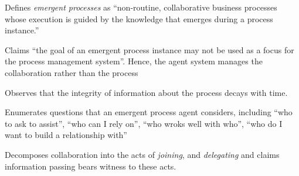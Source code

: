 \begin{albResearchNote}{%
    \citet{debenham05:_multiag_system_manag_collab_emerg_proces}%
  }{%
  }
\item Defines \emph{emergent processes} as ``non-routine, collaborative
  business processes whose execution is guided by the knowledge that
  emerges during a process instance.''
\item Claims ``the goal of an emergent process instance may not be used
  as a focus for the process management system''.  Hence, the agent
  system manages the collaboration rather than the process
\item Observes that the integrity of information about the process
  decays with time.
\item Enumerates questions that an emergent process agent considers,
  including ``who to ask to assist'', ``who can I rely on'', ``who wroks
  well with who'', ``who do I want to build a relationship with''
\item Decomposes collaboration into the acts of \emph{joining}, and
  \emph{delegating} and claims information passing bears witness to
  these acts.
\end{albResearchNote}

%
%
%




